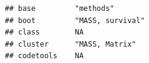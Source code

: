 \documentclass[]{article}
\begin{document}
\begin{verbatim}
## base         "methods"                                                                                                                                                                                                                                                                                                                                                                                                                                                                                                                                                                                 
## boot         "MASS, survival"                                                                                                                                                                                                                                                                                                                                                                                                                                                                                                                                                                          
## class        NA                                                                                                                                                                                                                                                                                                                                                                                                                                                                                                                                                                                        
## cluster      "MASS, Matrix"                                                                                                                                                                                                                                                                                                                                                                                                                                                                                                                                                                            
## codetools    NA                                                                                                                                                                                                                                                                                                                                                                                                                                                                                                                                                                                        

\end{verbatim}
\end{document}
